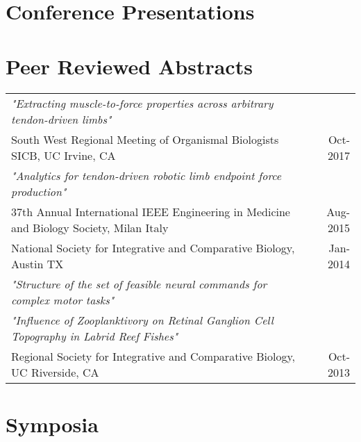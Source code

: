 \documentclass[10pt,a4paper]{article}
\begin{document}
\newpage
  \vspace*{2mm}\section*{\textbf{Conference Presentations}}

  \vspace*{2mm}\section*{Peer Reviewed Abstracts}

  \vspace*{1mm}\noindent\begin{tabularx}{17cm}{X r}

    \textit{"Extracting muscle-to-force properties across arbitrary tendon-driven limbs"}\\
	  South West Regional Meeting of Organismal Biologists SICB, UC Irvine, CA & Oct-2017 \\[2mm] %

    \textit{"Analytics for tendon-driven robotic limb endpoint force production"}\\
    37th Annual International IEEE Engineering in Medicine and Biology Society, Milan Italy & Aug-2015 \\[2mm]  %

    National Society for Integrative and Comparative Biology, Austin TX & Jan-2014 \\  %
    \textit{"Structure of the set of feasible neural commands for complex motor tasks"}\\[2mm]

    \textit{"Influence of Zooplanktivory on Retinal Ganglion Cell Topography in Labrid Reef Fishes"}\\
    Regional Society for Integrative and Comparative Biology, UC Riverside, CA & Oct-2013 \\[2mm]
  \end{tabularx}

  \vspace*{2mm}\section*{Symposia}
\end{document}
